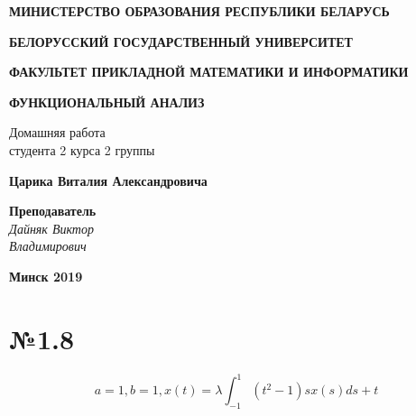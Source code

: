 \documentclass[oneside, final, 11pt]{article}
\begin{document}
\begin{titlepage}
	
	
	
	\centerline{\large \bf МИНИСТЕРСТВО ОБРАЗОВАНИЯ РЕСПУБЛИКИ БЕЛАРУСЬ}
	\bigskip
	\bigskip
	\centerline{\large \bf БЕЛОРУССКИЙ ГОСУДАРСТВЕННЫЙ УНИВЕРСИТЕТ}
	\bigskip
	\bigskip
	\centerline{\large \bf ФАКУЛЬТЕТ ПРИКЛАДНОЙ МАТЕМАТИКИ И ИНФОРМАТИКИ}
	\vfill
	\vfill
	\vfill
	\centerline{\Large \bf ФУНКЦИОНАЛЬНЫЙ АНАЛИЗ}
	\bigskip
	\bigskip
	\vfill
	\begin{centering}
		{\large
			Домашняя работа \\
			студента 2 курса 2 группы \\}
	\end{centering}
	\centerline{\large \bf Царика Виталия Александровича}
	\vfill
	\vfill
	\hfill
	\begin{minipage}{0.25\textwidth}
		{\large{\bf Преподаватель} \\
			{\it Дайняк Виктор \\ Владимирович}}
	\end{minipage}
	\vfill
	\vfill
	\centerline{\Large \bf Минск 2019}
	
\end{titlepage}

\restoregeometry
\section{№1.8}
\begin{equation*}
    a=1, b=1, x(t) = \lambda \int_{-1}^1(t^2-1)sx(s) ds+t
\end{equation*}
\end{document}

